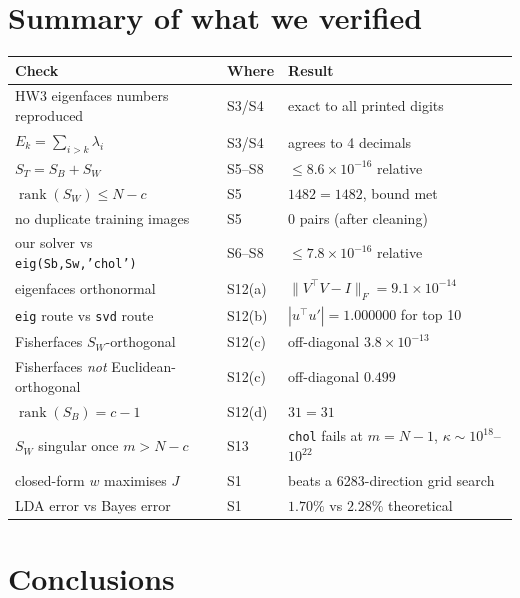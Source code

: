 \documentclass[11pt]{article}
\theoremstyle{definition}
\theoremstyle{remark}
\newcommand{\Sw}{S_W}
\newcommand{\Sb}{S_B}
\newcommand{\St}{S_T}
\newcommand{\rank}{\operatorname{rank}}
\begin{document}
\section{Summary of what we verified}

\begin{center}
\begin{tabular}{lll}
\toprule
Check & Where & Result \\
\midrule
HW3 eigenfaces numbers reproduced   & S3/S4 & exact to all printed digits \\
$E_k=\sum_{i>k}\lambda_i$           & S3/S4 & agrees to 4 decimals \\
$\St=\Sb+\Sw$                       & S5--S8 & $\le 8.6\times10^{-16}$ relative \\
$\rank(\Sw)\le N-c$                 & S5 & $1482 = 1482$, bound met \\
no duplicate training images        & S5 & $0$ pairs (after cleaning) \\
our solver vs \texttt{eig(Sb,Sw,'chol')} & S6--S8 & $\le 7.8\times10^{-16}$ relative \\
eigenfaces orthonormal              & S12(a) & $\|V^{\!\top} V-I\|_F=9.1\times10^{-14}$ \\
\texttt{eig} route vs \texttt{svd} route & S12(b) & $|u^{\!\top} u'|=1.000000$ for top 10 \\
Fisherfaces $\Sw$-orthogonal        & S12(c) & off-diagonal $3.8\times10^{-13}$ \\
Fisherfaces \emph{not} Euclidean-orthogonal & S12(c) & off-diagonal $0.499$ \\
$\rank(\Sb)=c-1$                    & S12(d) & $31 = 31$ \\
$\Sw$ singular once $m>N-c$         & S13 & \texttt{chol} fails at $m=N-1$, $\kappa\sim10^{18}$--$10^{22}$ \\
closed-form $w$ maximises $J$       & S1 & beats a 6283-direction grid search \\
LDA error vs Bayes error            & S1 & $1.70\%$ vs $2.28\%$ theoretical \\
\bottomrule
\end{tabular}
\end{center}

\section{Conclusions}
\end{document}
